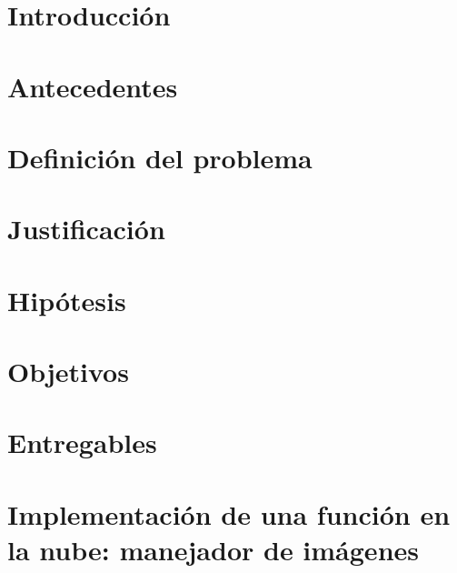 \documentclass[12pt, twoside]{report}
\begin{document}
\tableofcontents
\listoffigures
\listoftables
\listofalgorithms

\printglossary[type=\acronymtype, title=Acrónimos]

\printglossaries

\chapter{Introducción}


\chapter{Antecedentes}
\label{cap:antecedentes}


\chapter{Definición del problema}
\label{cap:problema}


\chapter{Justificación}
\label{cap:justificacion}


\chapter{Hipótesis}
\label{cap:hipotesis}


\chapter{Objetivos}
\label{cap:objetivos}


\chapter{Entregables}
\label{cap:entregables}


\chapter[Implementación de una \emph{FaaS}: manejador de imágnenes]{Implementación de una función en la nube: manejador de imágenes}
\label{cap:manejador-imagenes}

\end{document}
